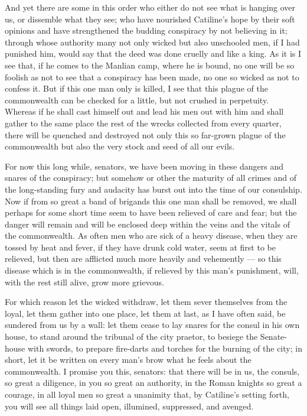  And yet there are some in this order who either do not see what is hanging over us, or dissemble what they see; who have nourished Catiline's hope by their soft opinions and have strengthened the budding conspiracy by not believing in it; through whose authority many not only wicked but also unschooled men, if I had punished him, would say that the deed was done cruelly and like a king. As it is I see that, if he comes to the Manlian camp, where he is bound, no one will be so foolish as not to see that a conspiracy has been made, no one so wicked as not to confess it. But if this one man only is killed, I see that this plague of the commonwealth can be checked for a little, but not crushed in perpetuity. Whereas if he shall cast himself out and lead his men out with him and shall gather to the same place the rest of the wrecks collected from every quarter, there will be quenched and destroyed not only this so far-grown plague of the commonwealth but also the very stock and seed of all our evils.

 For now this long while, senators, we have been moving in these dangers and snares of the conspiracy; but somehow or other the maturity of all crimes and of the long-standing fury and audacity has burst out into the time of our consulship. Now if from so great a band of brigands this one man shall be removed, we shall perhaps for some short time seem to have been relieved of care and fear; but the danger will remain and will be enclosed deep within the veins and the vitals of the commonwealth. As often men who are sick of a heavy disease, when they are tossed by heat and fever, if they have drunk cold water, seem at first to be relieved, but then are afflicted much more heavily and vehemently --- so this disease which is in the commonwealth, if relieved by this man's punishment, will, with the rest still alive, grow more grievous.

 For which reason let the wicked withdraw, let them sever themselves from the loyal, let them gather into one place, let them at last, as I have often said, be sundered from us by a wall: let them cease to lay snares for the consul in his own house, to stand around the tribunal of the city praetor, to besiege the Senate-house with swords, to prepare fire-darts and torches for the burning of the city; in short, let it be written on every man's brow what he feels about the commonwealth. I promise you this, senators: that there will be in us, the consuls, so great a diligence, in you so great an authority, in the Roman knights so great a courage, in all loyal men so great a unanimity that, by Catiline's setting forth, you will see all things laid open, illumined, suppressed, and avenged.

